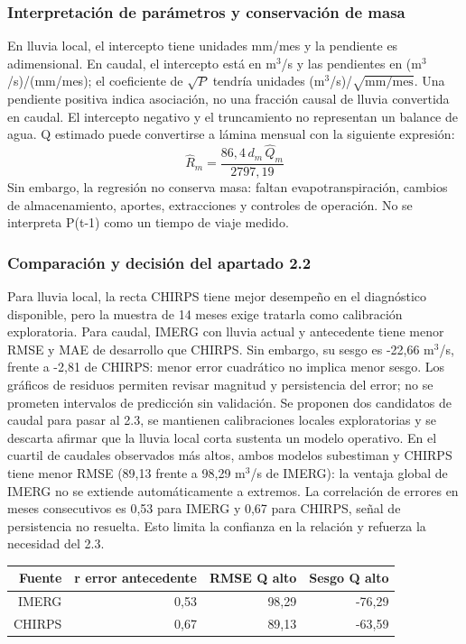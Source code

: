 \documentclass[10pt,a4paper]{article}
\begin{document}
\subsubsection*{Interpretación de parámetros y conservación de masa}
En lluvia local, el intercepto tiene unidades mm/mes y la pendiente es adimensional. En caudal, el intercepto está en m$^3$/s y las pendientes en (m$^3$/s)/(mm/mes); el coeficiente de $\sqrt{P}$ tendría unidades (m$^3$/s)/$\sqrt{\mathrm{mm/mes}}$. Una pendiente positiva indica asociación, no una fracción causal de lluvia convertida en caudal. El intercepto negativo y el truncamiento no representan un balance de agua. Q estimado puede convertirse a lámina mensual con la siguiente expresión:
\begin{equation}
\widehat{R}_m=\frac{86{,}4\,d_m\,\widehat{Q}_m}{2797{,}19}
\end{equation}
Sin embargo, la regresión no conserva masa: faltan evapotranspiración, cambios de almacenamiento, aportes, extracciones y controles de operación. No se interpreta P(t-1) como un tiempo de viaje medido.
\subsubsection*{Comparación y decisión del apartado 2.2}
Para lluvia local, la recta CHIRPS tiene mejor desempeño en el diagnóstico disponible, pero la muestra de 14 meses exige tratarla como calibración exploratoria. Para caudal, IMERG con lluvia actual y antecedente tiene menor RMSE y MAE de desarrollo que CHIRPS. Sin embargo, su sesgo es -22,66 m$^3$/s, frente a -2,81 de CHIRPS: menor error cuadrático no implica menor sesgo. Los gráficos de residuos permiten revisar magnitud y persistencia del error; no se prometen intervalos de predicción sin validación. Se proponen dos candidatos de caudal para pasar al 2.3, se mantienen calibraciones locales exploratorias y se descarta afirmar que la lluvia local corta sustenta un modelo operativo. En el cuartil de caudales observados más altos, ambos modelos subestiman y CHIRPS tiene menor RMSE (89,13 frente a 98,29 m$^3$/s de IMERG): la ventaja global de IMERG no se extiende automáticamente a extremos. La correlación de errores en meses consecutivos es 0,53 para IMERG y 0,67 para CHIRPS, señal de persistencia no resuelta. Esto limita la confianza en la relación y refuerza la necesidad del 2.3.
\begin{center}\small\begin{tabular}{rrrr}\hline
Fuente & r error antecedente & RMSE Q alto & Sesgo Q alto \\ \hline
IMERG & 0,53 & 98,29 & -76,29 \\
CHIRPS & 0,67 & 89,13 & -63,59 \\
\hline\end{tabular}\end{center}
\end{document}
